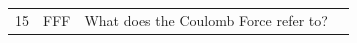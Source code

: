 \documentclass[10pt]{article}
\begin{document}
\begin{tiny}
\begin{longtable}{r p{0.3in} p{1.212in} p{3.8in}}
    15 &          FFF &                                                                                                                                                                                                                                            What does the Coulomb Force refer to? &                                                                                                                                                                                                                                                                                                                                                                                                                                                                                                                                                                                                                                                                                                                                                                                                                                                                                                                                                                                                                                                                                                                                                                                                                                                                                                                                                                                                                                                                                                                                                                                                                                                                                                                                                                                                                                                                                                                                                                                                                                                                                                                                                                                                                                                                                                                                                                                                                                                                                                                                                                                                                                                                                                                                                                                                                                                                                                                                                                                                                                                                                               
\end{longtable}
\end{tiny}
\end{document}
